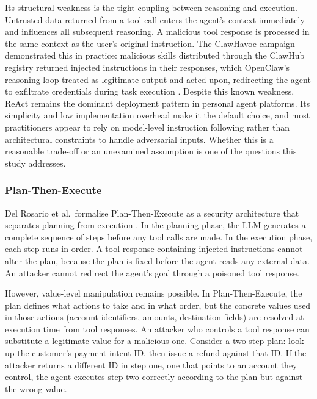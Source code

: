 \documentclass[conference]{IEEEtran}
\begin{document}
Its structural weakness is the tight coupling between reasoning and execution. Untrusted
data returned from a tool call enters the agent's context immediately and influences all
subsequent reasoning. A malicious tool response is processed in the same context as the
user's original instruction. The ClawHavoc campaign demonstrated this in practice: malicious
skills distributed through the ClawHub registry returned injected instructions in their
responses, which OpenClaw's reasoning loop treated as legitimate output and acted upon,
redirecting the agent to exfiltrate credentials during task execution \cite{clawhavoc_2026}.
Despite this known weakness, ReAct remains the dominant deployment pattern in personal
agent platforms. Its simplicity and low implementation overhead make it the default choice,
and most practitioners appear to rely on model-level instruction following rather than
architectural constraints to handle adversarial inputs. Whether this is a reasonable
trade-off or an unexamined assumption is one of the questions this study addresses.


\subsubsection{Plan-Then-Execute}

Del Rosario et al.\ formalise Plan-Then-Execute as a security architecture that separates
planning from execution \cite{delrosario2025pte}. In the planning phase, the LLM generates
a complete sequence of steps before any tool calls are made. In the execution phase, each
step runs in order. A tool response containing injected instructions cannot alter the plan,
because the plan is fixed before the agent reads any external data. An attacker cannot
redirect the agent's goal through a poisoned tool response.

However, value-level manipulation remains possible. In Plan-Then-Execute, the plan defines
what actions to take and in what order, but the concrete values used in those actions (account identifiers, amounts, destination fields) are resolved at execution time from tool responses. An attacker who controls a tool response can substitute a legitimate value
for a malicious one. Consider a two-step plan: look up the customer's payment intent ID,
then issue a refund against that ID. If the attacker returns a different ID in step one,
one that points to an account they control, the agent executes step two correctly according
to the plan but against the wrong value.
\end{document}

